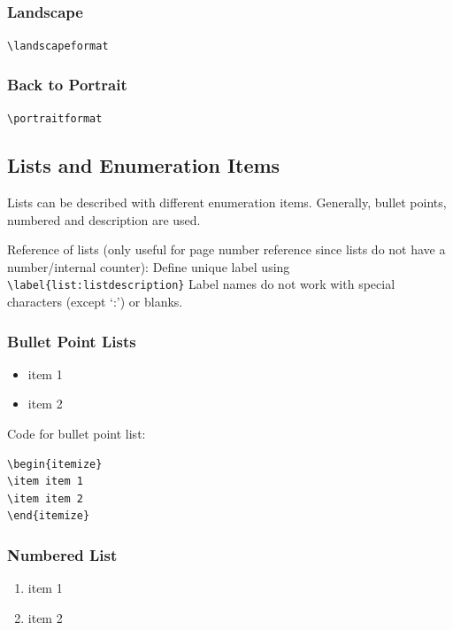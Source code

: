 \documentclass{pharmrep}
\begin{document}
\landscapeformat
\subsubsection{Landscape}
\verb|\landscapeformat|

\blindtext

\blindtext

\portraitformat
\subsubsection{Back to Portrait}
\verb|\portraitformat|

\blindtext

\subsection{Lists and Enumeration Items}
Lists can be described with different enumeration items. Generally, bullet points, numbered and
description are used.

Reference of lists (only useful for page number reference since lists do not have a number/internal
counter):
Define unique label using\newline
\verb|\label{list:listdescription}| \newline
Label names do not work with special characters (except `:') or blanks.

\subsubsection{Bullet Point Lists}
\begin{itemize}
\item item 1
\item item 2
\end{itemize}

Code for bullet point list:
\begin{verbatim}
\begin{itemize}
\item item 1
\item item 2
\end{itemize}
\end{verbatim}

\subsubsection{Numbered List}
\begin{enumerate}
\item item 1
\item item 2
\end{enumerate}
\end{document}
